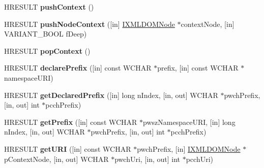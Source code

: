 \begin{DoxyCompactItemize}
H\+R\+E\+S\+U\+LT {\bfseries push\+Context} ()
\item 
\mbox{\label{interface_m_s_x_m_l2_1_1_i_m_x_namespace_manager_a32c79639b6b72a22495c91059f7567cb}} 
H\+R\+E\+S\+U\+LT {\bfseries push\+Node\+Context} (\mbox{[}in\mbox{]} \hyperlink{interface_m_s_x_m_l2_1_1_i_x_m_l_d_o_m_node}{I\+X\+M\+L\+D\+O\+M\+Node} $\ast$context\+Node, \mbox{[}in\mbox{]} V\+A\+R\+I\+A\+N\+T\+\_\+\+B\+O\+OL f\+Deep)
\item 
\mbox{\label{interface_m_s_x_m_l2_1_1_i_m_x_namespace_manager_a475969e897c1492d3958f6212031cbb7}} 
H\+R\+E\+S\+U\+LT {\bfseries pop\+Context} ()
\item 
\mbox{\label{interface_m_s_x_m_l2_1_1_i_m_x_namespace_manager_af0eb6d291e8e67e3fbccd63f2e0a3f89}} 
H\+R\+E\+S\+U\+LT {\bfseries declare\+Prefix} (\mbox{[}in\mbox{]} const W\+C\+H\+AR $\ast$prefix, \mbox{[}in\mbox{]} const W\+C\+H\+AR $\ast$namespace\+U\+RI)
\item 
\mbox{\label{interface_m_s_x_m_l2_1_1_i_m_x_namespace_manager_a5f7f412eff4e7b88d325d294c6521a93}} 
H\+R\+E\+S\+U\+LT {\bfseries get\+Declared\+Prefix} (\mbox{[}in\mbox{]} long n\+Index, \mbox{[}in, out\mbox{]} W\+C\+H\+AR $\ast$pwch\+Prefix, \mbox{[}in, out\mbox{]} int $\ast$pcch\+Prefix)
\item 
\mbox{\label{interface_m_s_x_m_l2_1_1_i_m_x_namespace_manager_a7c2985178d6e7a2aba6dda34e37c82a5}} 
H\+R\+E\+S\+U\+LT {\bfseries get\+Prefix} (\mbox{[}in\mbox{]} const W\+C\+H\+AR $\ast$pwsz\+Namespace\+U\+RI, \mbox{[}in\mbox{]} long n\+Index, \mbox{[}in, out\mbox{]} W\+C\+H\+AR $\ast$pwch\+Prefix, \mbox{[}in, out\mbox{]} int $\ast$pcch\+Prefix)
\item 
\mbox{\label{interface_m_s_x_m_l2_1_1_i_m_x_namespace_manager_aa67b5c1118099d7eb5de2dce313bb46c}} 
H\+R\+E\+S\+U\+LT {\bfseries get\+U\+RI} (\mbox{[}in\mbox{]} const W\+C\+H\+AR $\ast$pwch\+Prefix, \mbox{[}in\mbox{]} \hyperlink{interface_m_s_x_m_l2_1_1_i_x_m_l_d_o_m_node}{I\+X\+M\+L\+D\+O\+M\+Node} $\ast$p\+Context\+Node, \mbox{[}in, out\mbox{]} W\+C\+H\+AR $\ast$pwch\+Uri, \mbox{[}in, out\mbox{]} int $\ast$pcch\+Uri)

\end{DoxyCompactItemize}
